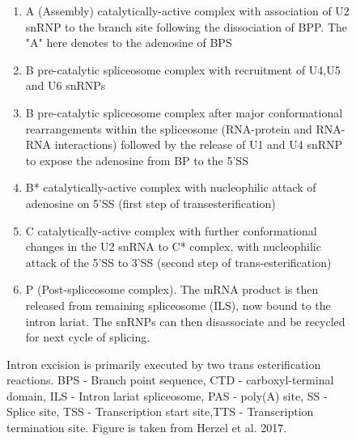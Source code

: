 \begin{figure}[!htp]
{\begin{enumerate}
			\item A (Assembly) catalytically-active complex with association of U2 snRNP to the branch site following the dissociation of BPP. The "A" here denotes to the adenosine of BPS
			\item B pre-catalytic spliceosome complex with recruitment of U4,U5 and U6 snRNPs
			\item B pre-catalytic spliceosome complex after major conformational rearrangements within the spliceosome (RNA-protein and RNA-RNA interactions) followed by the release of U1 and U4 snRNP to expose the adenosine from BP to the 5'SS 
			\item B* catalytically-active complex with nucleophilic attack of adenosine on 5'SS (first step of transesterification) 
			\item C catalytically-active complex with further conformational changes in the U2 snRNA to C* complex, with nucleophilic attack of the 5'SS to 3'SS (second step of trans-esterification) 
			\item P (Post-spliceosome complex). The mRNA product is then released from remaining spliceosome (ILS), now bound to the intron lariat. The snRNPs can then disassociate and be recycled for next cycle of splicing.
			\\
		\end{enumerate} 
		Intron excision is primarily executed by two trans esterification reactions.	BPS - Branch point sequence, CTD - carboxyl-terminal domain, ILS - Intron lariat spliceosome, PAS - poly(A) site, SS - Splice site, TSS - Transcription start site,TTS - Transcription termination site. Figure is taken from Herzel et al. 2017\cite{Herzel2017}.
	}
	\label{fig:AS_mechanism}
\end{figure}

